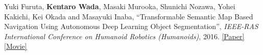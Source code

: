 \documentclass[letterpaper,MMMyyyy,nonstop]{simpleresumecv}
\begin{document}
\begin{body}
\BigGapNoBreak

Yuki Furuta, \textbf{Kentaro Wada}, Masaki Murooka, Shunichi Nozawa, Yohei Kakichi, Kei Okada and Masayuki Inaba,
``Transformable Semantic Map Based Navigation Using Autonomous Deep Learning Object Segmentation'',
\textit{IEEE-RAS International Conference on Humanoid Robotics (Humanoids)}, 2016.
\href{http://ieeexplore.ieee.org/document/7803338/}{\underline{[Paper]}}
\href{https://drive.google.com/open?id=1ljJQ4SUjkNT1S1GWb4h7h__zbStz3oOo}{\underline{[Movie]}}

%
%
%
%
%

\end{body}
\end{document}
